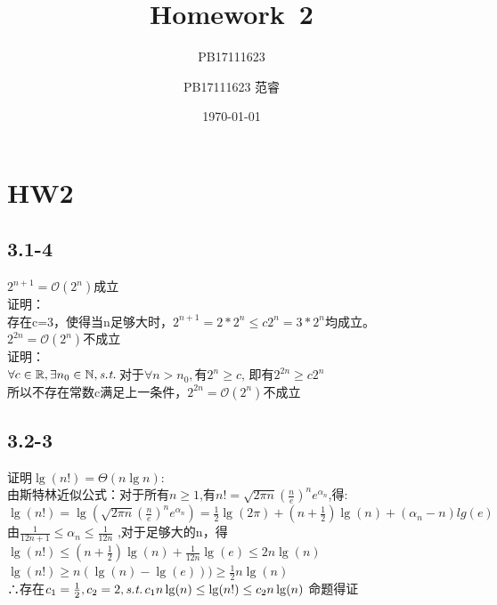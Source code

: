 \documentclass[UTF8]{ctexart}
\title{Homework\ 2}
\author{PB17111623}
\author{PB17111623 范睿}
\date{\today}
\begin{document}
\maketitle

\section{HW2}

\subsection{3.1-4}
$2^{n+1}=\mathcal{O}(2^{n})$成立\\
证明：\\
存在c=3，使得当n足够大时，$2^{n+1}=2*2^{n} \leq c2^{n}=3*2^{n}$均成立。\\
$2^{2n}=\mathcal{O}(2^{n})$不成立\\
证明：\\
${\forall}c \in \mathbb{R},{\exists}n_0 \in \mathbb{N},\emph{s.t.}\,$对于${\forall}n>n_0,$有$2^{n} \ge c,\,$即有$2^{2n} \ge c2^{n}$\\
所以不存在常数c满足上一条件，$2^{2n}=\mathcal{O}(2^{n})$不成立\\

\subsection{3.2-3}
证明$\lg(n!)=\Theta(n\lg n)$:\\
由斯特林近似公式：对于所有$n\ge 1$,有$n!=\sqrt{2\pi n}(\frac{n}{e})^{n}e^{\alpha_n}$,得:\\
$\lg(n!)=\lg(\sqrt{2\pi n}(\frac{n}{e})^{n}e^{\alpha_n})=\frac{1}{2}\lg(2\pi)+(n+\frac{1}{2})\lg(n)+(\alpha_n-n)lg(e)$\\
由$\frac{1}{12n+1}\le \alpha_n \le \frac{1}{12n}$ ,对于足够大的n，得\\
$\lg(n!)\leq (n+\frac{1}{2})\lg(n)+\frac{1}{12n}\lg(e) \le 2n\lg(n)$\\
$\lg(n!)\geq n(\lg(n)-\lg(e))) \ge \frac{1}{2}n\lg(n)$\\
∴存在$c_1=\frac{1}{2},c_2=2, \emph{s.t.}\,c_1n\lg(n) \leq \lg(n!) \leq c_2n\lg(n)$
命题得证
\end{document}
